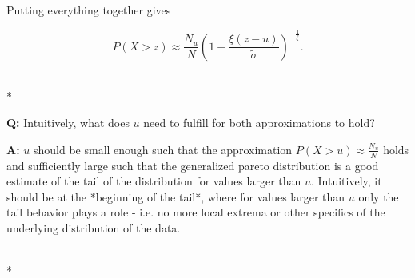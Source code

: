 Putting everything together gives


\begin{equation}
    P(X>z) \approx \frac{N_u}{N}  \left( 1 + \frac{\xi (z-u)}{\tilde{\sigma}} \right)^{-\frac{1}{\xi}}.
\end{equation}


\hrulefill\\*

\textbf{Q:} Intuitively, what does $u$ need to fulfill for both approximations to
hold?

\textbf{A:} $u$ should be small enough such that the approximation $P(X>u) \approx
\frac{N_u}{N}$ holds and sufficiently large such that the generalized pareto
distribution is a good estimate of the tail of the distribution for values
larger than $u$. Intuitively, it should be at the *beginning of the tail*, where
for values larger than $u$ only the tail behavior plays a role - i.e. no more
local extrema or other specifics of the underlying distribution of the data.

\hrulefill\\*
